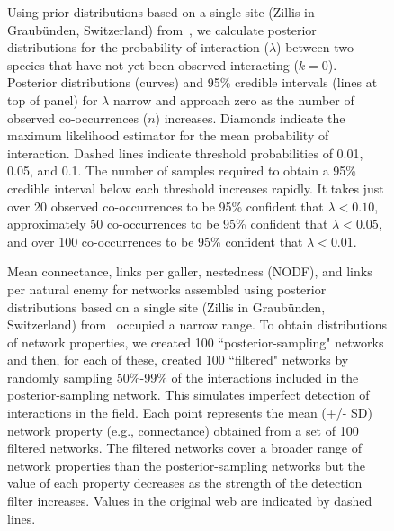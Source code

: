 \documentclass[12pt]{article}
\begin{document}
  \begin{figure}[h!]
    \caption{Using prior distributions based on a single site (Zillis in Graub\"{u}nden, Switzerland) from~\citet{Kopelke2017}, we calculate posterior distributions for the probability of interaction ($\lambda$) between two species that have not yet been observed interacting ($k = 0$). 
    Posterior distributions (curves) and 95\% credible intervals (lines at top of panel) for $\lambda$ narrow and approach zero as the number of observed co-occurrences ($n$) increases. Diamonds indicate the maximum likelihood estimator for the mean probability of interaction.
    Dashed lines indicate threshold probabilities of 0.01, 0.05, and 0.1. The number of samples required to obtain a 95\% credible interval below each threshold increases rapidly. It takes just over 20 observed co-occurrences to be 95\% confident that $\lambda<0.10$, approximately 50 co-occurrences to be 95\% confident that $\lambda<0.05$, and over 100 co-occurrences to be 95\% confident that $\lambda<0.01$.}
    \label{Salix_pdfs_cdfs}
    \begin{center}
    \end{center}
    \end{figure}


  \begin{figure}[h!]
    \caption{Mean connectance, links per galler, nestedness (NODF), and links per natural enemy for networks assembled using posterior distributions based on a single site (Zillis in Graub\"{u}nden, Switzerland) from~\citet{Kopelke2017} occupied a narrow range. To obtain distributions of network properties, we created 100 ``posterior-sampling" networks and then, for each of these, created 100 ``filtered" networks by randomly sampling 50\%-99\% of the interactions included in the posterior-sampling network. This simulates imperfect detection of interactions in the field. Each point represents the mean (+/- SD) network property (e.g., connectance) obtained from a set of 100 filtered networks. The filtered networks cover a broader range of network properties than the posterior-sampling networks but the value of each property decreases as the strength of the detection filter increases. Values in the original web are indicated by dashed lines.}
    \label{posterior_webs}    
    \begin{center}
    \end{center}
    \end{figure}


\clearpage

     
\end{document}
